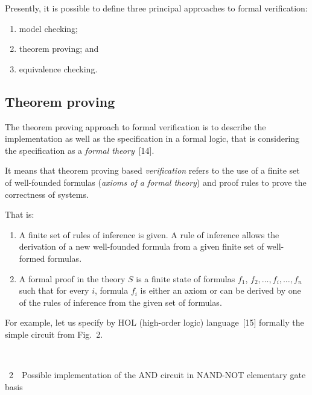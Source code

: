\begin{multicols}{2}
   Presently, it is possible to define three principal approaches to formal verification:
\begin{enumerate}[(1)]
\item model checking;
\item  theorem proving; and
\item equivalence checking.
\end{enumerate}

\subsection{Theorem proving} %

\noindent
The theorem proving approach to formal verification is to describe the implementation as well as the
specification in a formal logic, that is considering the specification as a \textit{formal theory}~[14].

   It means that theorem proving based \textit{verification} refers to the use of a finite set of well-founded
formulas (\textit{axioms of a formal theory}) and proof rules to prove the correctness of systems.

    That is:
    \begin{enumerate}[1.]
\item A finite set of rules of inference is given. A rule of inference allows the derivation of a new
well-founded formula from a given finite set of well-formed formulas.
\item A formal proof in the theory $S$ is a finite state of formulas $f_1$, $f_2, \ldots , f_i,\ldots , f_n$ 
such that for every $i$,
formula $f_i$ is either an axiom or can be derived by one of the rules of inference from the given set of
formulas.
\end{enumerate}

   For example, let us specify by HOL (high-order logic) language~[15] formally the simple circuit
from Fig.~2.

\bigskip

\vspace*{1pt}
\begin{center}
\mbox{%
\epsfxsize=78.097mm
}
\end{center}
\vspace*{3pt}
{\figurename~2}\ \ {\small Possible implementation of the AND circuit in NAND-NOT elementary gate basis}


\end{multicols}
